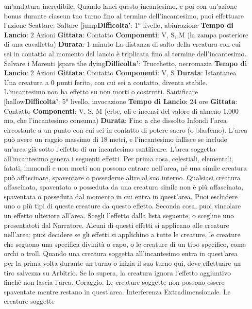 \begin{multicols}{2}
un’andatura incredibile. Quando lanci questo
incantesimo, e poi con un’azione bonus durante
ciascun tuo turno fino al termine dell’incantesimo, puoi
effettuare l’azione Scattare.
Saltare
[jump\textbf{Difficolta'}:
1° livello, abiurazione
\textbf{Tempo di Lancio}: 2 Azioni
\textbf{Gittata}: Contatto
\textbf{Componenti}: V, S, M (la zampa posteriore di una
cavalletta)
\textbf{Durata}: 1 minuto
La distanza di salto della creatura con cui sei in contatto
al momento del lancio è triplicata fino al termine
dell’incantesimo.
Salvare i Morenti
[spare the dying\textbf{Difficolta'}:
Trucchetto, necromazia
\textbf{Tempo di Lancio}: 2 Azioni
\textbf{Gittata}: Contatto
\textbf{Componenti}: V, S
\textbf{Durata}: Istantanea
Una creatura a 0 punti ferita, con cui sei a contatto,
diventa stabile. L’incantesimo non ha effetto su non
morti o costrutti.
Santificare
[hallow\textbf{Difficolta'}:
5° livello, invocazione
\textbf{Tempo di Lancio}: 24 ore
\textbf{Gittata}: Contatto
\textbf{Componenti}: V, S, M (erbe, oli e incensi del valore di
almeno 1.000 mo, che l’incantesimo consuma)
\textbf{Durata}: Fino a che dissolto
Infondi l’area circostante a un punto con cui sei in
contatto di potere sacro (o blasfemo). L’area può avere
un raggio massimo di 18 metri, e l’incantesimo fallisce
se include un’area già sotto l’effetto di un incantesimo
santificare. L’area soggetta all’incantesimo genera i
seguenti effetti.
Per prima cosa, celestiali, elementali, fatati, immondi e
non morti non possono entrare nell’area, né una simile
creatura può affascinare, spaventare o possederne
altre al suo interno. Qualsiasi creatura affascinata,
spaventata o posseduta da una creatura simile non è
più affascinata, spaventata o posseduta dal momento in
cui entra in quest’area. Puoi escludere uno o più tipi di
queste creature da questo effetto.
Seconda cosa, puoi vincolare un effetto ulteriore
all’area. Scegli l’effetto dalla lista seguente, o scegline
uno presentatoti dal Narratore. Alcuni di questi effetti si
applicano alle creature nell’area; puoi decidere se gli
effetti si applichino a tutte le creature, le creature che
seguono una specifica divinità o capo, o le creature di
un tipo specifico, come orchi o troll. Quando una
creatura soggetta all’incantesimo entra in quest’area
per la prima volta durante un turno o inizia il suo turno
qui, deve effettuare un tiro salvezza su Arbitrio. Se lo
supera, la creatura ignora l’effetto aggiuntivo finché non
lascia l’area.
Coraggio. Le creature soggette non possono essere
spaventate mentre restano in quest’area.
Interferenza Extradimensionale. Le creature soggette

\end{multicols}
